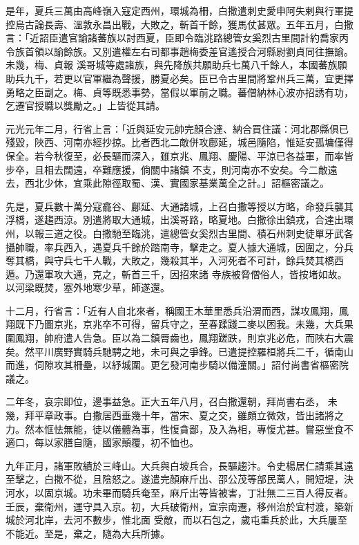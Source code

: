 \begin{pinyinscope}
 是年，夏兵三萬由高峰嶺入寇定西州，環城為柵，白撒遣刺史愛申阿失剌與行軍提控烏古論長壽、溫敦永昌出戰，大敗之，斬首千餘，獲馬仗甚眾。五年五月，白撒言：「近詔臣遣官諭諸蕃族以討西夏，臣即令臨洮路總管女奚烈古里間計約喬家丙令族首領以諭餘族。又別遣權左右司都事趙梅委差官遙授合河縣尉劉貞同往撫諭。未幾，梅、貞報
 溪哥城等處諸族，與先降族共願助兵七萬八千餘人，本國蕃族願助兵九千，若更以官軍繼為聲援，勝夏必矣。臣已令古里間將鞏州兵三萬，宜更擇勇略之臣副之。梅、貞等既悉事勢，當假以軍前之職。蕃僧納林心波亦招誘有功，乞遷官授職以獎勵之。」上皆從其請。



 元光元年二月，行省上言：「近與延安元帥完顏合達、納合買住議：河北郡縣俱已殘毀，陜西、河南亦經抄掠。比者西北二敵併攻鄜延，城邑隨陷，惟延安孤墉僅得保全。若今秋復至，必長驅而深入，雖京兆、鳳翔、慶陽、平涼已各益軍，而率皆步卒，且相去闊遠，卒難應援，倘關中諸鎮
 不支，則河南亦不安矣。今二敵遠去，西北少休，宜乘此隙徑取蜀、漢、實國家基業萬全之計。」詔樞密議之。



 先是，夏兵數十萬分寇龕谷、鄜延、大通諸城，上召白撒等授以方略，命發兵襲其浮橋，遂趨西涼。別遣將取大通城，出溪哥路，略夏地。白撒徐出鎮戎，合達出環州，以報三道之役。白撒馳至臨洮，遣總管女奚烈古里間、積石州刺史徒單牙武各攝帥職，率兵西入，遇夏兵千餘於踏南寺，擊走之。夏人據大通城，因圍之，分兵奪其橋，與守兵七千人戰，大敗之，幾殺其半，入河死者不可計，餘兵焚其橋西遁。乃還軍攻大通，克之，斬首三千，因招來諸
 寺族被脅僧俗人，皆按堵如故。以河梁既焚，塞外地寒少草，師遂還。



 十二月，行省言：「近有人自北來者，稱國王木華里悉兵沿渭而西，謀攻鳳翔，鳳翔既下乃圖京兆，京兆卒不可得，留兵守之，至春蹂踐二麥以困我。未幾，大兵果圍鳳翔，帥府遣人告急。臣以為二鎮脣齒也，鳳翔蹉跌，則京兆必危，而陜右大震矣。然平川廣野實騎兵馳騁之地，未可與之爭鋒。已遣提控羅桓將兵二千，循南山而進，伺隙攻其柵壘，以紓城圍。更乞發河南步騎以備潼關。」詔付尚書省樞密院議之。



 二年冬，哀宗即位，邊事益急。正大五年八月，召白撒還朝，拜尚書右丞，
 未幾，拜平章政事。白撒居西垂幾十年，當宋、夏之交，雖頗立微效，皆出諸將之力。然本恇怯無能，徒以儀體為事，性愎貪鄙，及入為相，專愎尤甚。嘗惡堂食不適口，每以家膳自隨，國家顛覆，初不恤也。



 九年正月，諸軍敗績於三峰山。大兵與白坡兵合，長驅趨汴。令史楊居仁請乘其遠至擊之，白撒不從，且陰怒之。遂遣完顏麻斤出、邵公茂等部民萬人，開短堤，決河水，以固京城。功未畢而騎兵奄至，麻斤出等皆被害，丁壯無二三百人得反者。壬辰，棄衛州，運守具入京。初，大兵破衛州，宣宗南遷，移州治於宜村渡，築新城於河北岸，去河不數步，惟北面
 受敵，而以石包之，歲屯重兵於此，大兵屢至不能近。至是，棄之，隨為大兵所據。




\end{pinyinscope}
